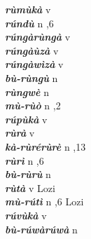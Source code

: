 \begin{multicols}{2}
{{\bfseries\itshape rùmùkà}} \relax  v  \relax   \relax  {} \relax   \relax  \\
{{\bfseries\itshape rúndù}} \relax  n  ,6  \relax   \relax  \\
{{\bfseries\itshape rúngàrùngà}} \relax  v  \relax   \relax  {} \relax   \relax  \\
{{\bfseries\itshape rúngàùzà}} \relax  v  \relax   \relax  {} \relax   \relax  \\
{{\bfseries\itshape rúngàwìzà}} \relax  v  \relax   \relax  {} \relax   \relax  \\
{{\bfseries\itshape bù-rùngù}} \relax  n   \relax  {} \relax   \relax  \\
{{\bfseries\itshape rùngwè}} \relax  n   \relax  {} \relax   \relax  \\
{{\bfseries\itshape mù-rùò}} \relax  n  ,2  \relax   \relax  \\
{{\bfseries\itshape rúpùkà}} \relax  v  \relax   \relax  {} \relax   \relax  \\
{{\bfseries\itshape rùrà}} \relax  v  \relax   \relax  {} \relax   \relax  \\
{{\bfseries\itshape kà-rùrérùrè}} \relax  n  ,13  \relax   \relax  \\
{{\bfseries\itshape rùrì}} \relax  n  ,6  \relax   \relax  \\
{{\bfseries\itshape bù-rùrù}} \relax  n   \relax  {} \relax   \relax  \\
{{\bfseries\itshape rùtà}} \relax  v  \relax   \relax  {} \relax  Lozi \relax  \\
{{\bfseries\itshape mù-rútì}} \relax  n  ,6  \relax  Lozi \relax  \\
{{\bfseries\itshape rúvùkà}} \relax  v  \relax   \relax  {} \relax   \relax  \\
{{\bfseries\itshape bù-rúwàrúwà}} \relax  n   \relax  {} \relax   \relax  \\

\end{multicols}
